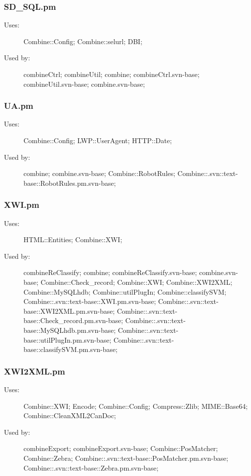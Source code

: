 \subsubsection{SD\_SQL.pm}
\begin{description}
\item[Uses:] Combine::Config; Combine::selurl; DBI; 

\item[Used by:] combineCtrl; combineUtil; combine; combineCtrl.svn-base; combineUtil.svn-base; combine.svn-base; 

\end{description}
\subsubsection{UA.pm}
\begin{description}
\item[Uses:] Combine::Config; LWP::UserAgent; HTTP::Date; 

\item[Used by:] combine; combine.svn-base; Combine::RobotRules; Combine::.svn::text-base::RobotRules.pm.svn-base; 

\end{description}
\subsubsection{XWI.pm}
\begin{description}
\item[Uses:] HTML::Entities; Combine::XWI; 

\item[Used by:] combineReClassify; combine; combineReClassify.svn-base; combine.svn-base; Combine::Check\_record; Combine::XWI; Combine::XWI2XML; Combine::MySQLhdb; Combine::utilPlugIn; Combine::classifySVM; Combine::.svn::text-base::XWI.pm.svn-base; Combine::.svn::text-base::XWI2XML.pm.svn-base; Combine::.svn::text-base::Check\_record.pm.svn-base; Combine::.svn::text-base::MySQLhdb.pm.svn-base; Combine::.svn::text-base::utilPlugIn.pm.svn-base; Combine::.svn::text-base::classifySVM.pm.svn-base; 

\end{description}
\subsubsection{XWI2XML.pm}
\begin{description}
\item[Uses:] Combine::XWI; Encode; Combine::Config; Compress::Zlib; MIME::Base64; Combine::CleanXML2CanDoc; 

\item[Used by:] combineExport; combineExport.svn-base; Combine::PosMatcher; Combine::Zebra; Combine::.svn::text-base::PosMatcher.pm.svn-base; Combine::.svn::text-base::Zebra.pm.svn-base; 

\end{description}
